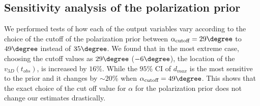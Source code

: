 \subsection{Sensitivity analysis of the polarization prior}
%
\label{sec: sensitivityTests}
We performed tests of how each of the output variables vary according to the
choice of the cutoff of the polarization prior between
$\alpha_{\text{cutoff}} =
29 \degree$ to $49\degree$ instead of $35 \degree$.  
We found that in the most extreme case, choosing the cutoff values as $29
\degree$ ($-6 \degree$), the location of the $v_{3D}(t_{obs})$, is
increased by $ 16 \%$. While the $95\%$ CI of $d_{max}$ is
the most sensitive to the prior and it changes by
$\sim20 \%$ when $\alpha_{\text{cutoff}} = 49 \degree$. 
This shows that the exact choice of the cut off value for $\alpha$ for the
polarization prior does not change our estimates drastically.
%
%
%
%
%
